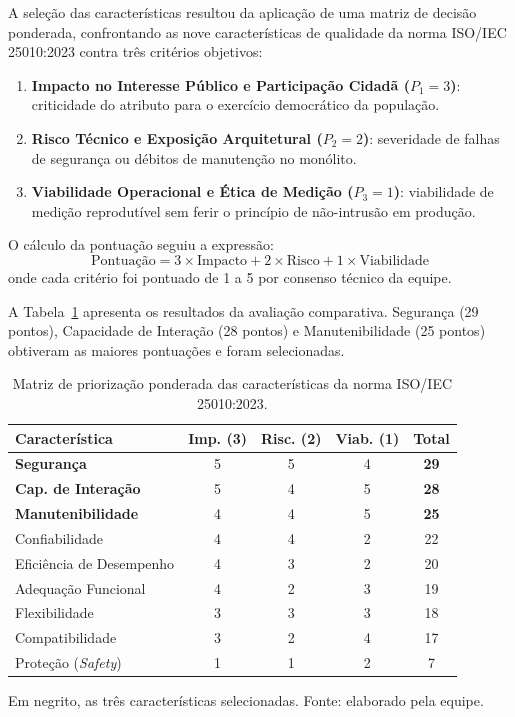 \documentclass[journal]{IEEEtran}
\begin{document}
A seleção das características resultou da aplicação de uma matriz de decisão ponderada, confrontando as nove características de qualidade da norma ISO/IEC 25010:2023 contra três critérios objetivos:
\begin{enumerate}
    \item \textbf{Impacto no Interesse Público e Participação Cidadã ($P_1 = 3$)}: criticidade do atributo para o exercício democrático da população.
    \item \textbf{Risco Técnico e Exposição Arquitetural ($P_2 = 2$)}: severidade de falhas de segurança ou débitos de manutenção no monólito.
    \item \textbf{Viabilidade Operacional e Ética de Medição ($P_3 = 1$)}: viabilidade de medição reprodutível sem ferir o princípio de não-intrusão em produção.
\end{enumerate}

O cálculo da pontuação seguiu a expressão:
\begin{equation}
\text{Pontuação} = 3 \times \text{Impacto} + 2 \times \text{Risco} + 1 \times \text{Viabilidade}
\label{eq:priorizacao}
\end{equation}
onde cada critério foi pontuado de 1 a 5 por consenso técnico da equipe. 

A Tabela~\ref{tab:priorizacao} apresenta os resultados da avaliação comparativa. Segurança (29 pontos), Capacidade de Interação (28 pontos) e Manutenibilidade (25 pontos) obtiveram as maiores pontuações e foram selecionadas. 

\begin{table}[!t]
\centering
\caption{Matriz de priorização ponderada das características da norma ISO/IEC 25010:2023.}
\label{tab:priorizacao}
\footnotesize
\setlength{\tabcolsep}{3pt}
\begin{tabular}{@{}l c c c c@{}}
\toprule
\textbf{Característica} & \textbf{Imp. (3)} & \textbf{Risc. (2)} & \textbf{Viab. (1)} & \textbf{Total} \\
\midrule
\textbf{Segurança} & 5 & 5 & 4 & \textbf{29} \\
\textbf{Cap. de Interação} & 5 & 4 & 5 & \textbf{28} \\
\textbf{Manutenibilidade} & 4 & 4 & 5 & \textbf{25} \\
Confiabilidade & 4 & 4 & 2 & 22 \\
Eficiência de Desempenho & 4 & 3 & 2 & 20 \\
Adequação Funcional & 4 & 2 & 3 & 19 \\
Flexibilidade & 3 & 3 & 3 & 18 \\
Compatibilidade & 3 & 2 & 4 & 17 \\
Proteção (\textit{Safety}) & 1 & 1 & 2 & 7 \\
\bottomrule
\end{tabular}

\vspace{2pt}
{\footnotesize Em negrito, as três características selecionadas. Fonte: elaborado pela equipe.}
\end{table}
\end{document}
